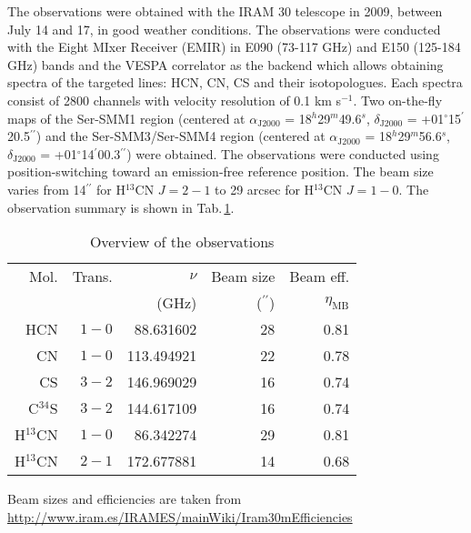 \documentclass[a4paper]{article}
\begin{document}
\indent \indent The observations were obtained with the IRAM 30 telescope in 2009, between July 14 and 17, in good weather conditions. The observations were conducted with the Eight MIxer Receiver (EMIR) in E090 (73-117 GHz) and E150 (125-184 GHz) bands and the VESPA correlator as the backend which allows obtaining spectra of the targeted lines: HCN, CN, CS and their isotopologues. Each spectra consist of 2800 channels with velocity resolution of 0.1 km s$^{-1}$. Two on-the-fly maps of the Ser-SMM1 region (centered at $\alpha_\mathrm{J2000}$ = 18$^h$29$^m$49.6$^s$, $\delta_\mathrm{J2000}$ = +01$^{\circ}$15$^{\prime}$20.5$^{\prime\prime}$) and the Ser-SMM3/Ser-SMM4 region (centered at $\alpha_\mathrm{J2000}$ = 18$^h$29$^m$56.6$^s$, $\delta_\mathrm{J2000}$ = +01$^{\circ}$14$^{\prime}$00.3$^{\prime\prime}$) were obtained. The observations were conducted using position-switching toward an emission-free reference position. The beam size varies from 14$^{\prime\prime}$ for H$^{13}$CN $J=2-1$ to 29 arcsec for H$^{13}$CN $J=1-0$. The observation summary is shown in Tab.\,\ref{tab:1}.
\begin{table}
\caption{Overview of the observations}             %
\label{tab:1}      %
\centering                          %
\begin{tabular}{r r r r r}        %
\hline\hline                 %
Mol. & Trans. & $\nu$ & Beam size & Beam eff.\\
 & & (GHz) & ($^{\prime\prime}$) & $\eta_\mathrm{MB}$\\
\hline                        %
HCN & $1-0$ & 88.631602 & 28 & 0.81\\
CN & $1-0$ & 113.494921 & 22 & 0.78\\
CS & $3-2$ & 146.969029 & 16 & 0.74\\
C$^{34}$S & $3-2$ & 144.617109 & 16 & 0.74\\
H$^{13}$CN & $1-0$ & 86.342274 & 29 & 0.81\\
H$^{13}$CN & $2-1$ & 172.677881 & 14 & 0.68\\
\hline                                   
\end{tabular}
\begin{flushleft}
Beam sizes and efficiencies are taken from \url{http://www.iram.es/IRAMES/mainWiki/Iram30mEfficiencies}
\end{flushleft}
\end{table}
\end{document}

